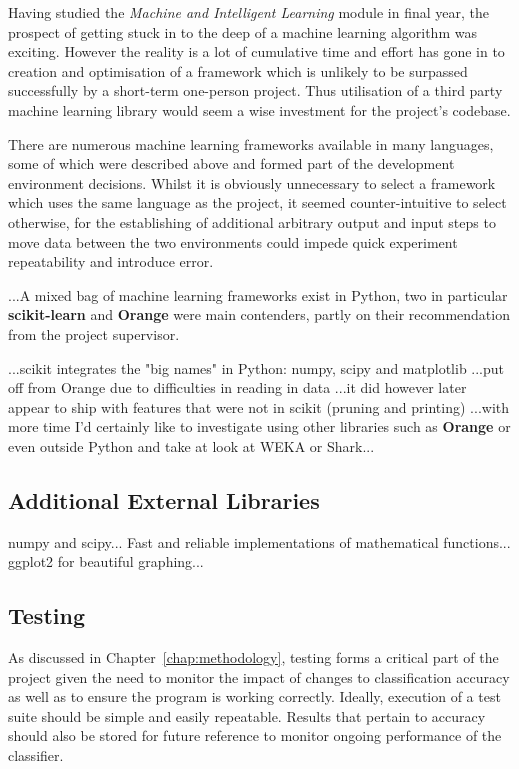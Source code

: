 Having studied the \textit{Machine and Intelligent Learning} module in final
year, the prospect of getting stuck in to the deep of a machine learning
algorithm was exciting. However the reality is a lot of cumulative time and
effort has gone in to creation and optimisation of a framework which is unlikely
to be surpassed successfully by a short-term one-person project. Thus
utilisation of a third party machine learning library would seem a wise
investment for the project's codebase.

There are numerous machine learning frameworks available in many languages, some
of which were described above and formed part of the development environment
decisions. Whilst it is obviously unnecessary to select a framework which uses
the same language as the project, it seemed counter-intuitive to select otherwise,
for the establishing of additional arbitrary output and input steps to move data
between the two environments could impede quick experiment repeatability and
introduce error.

...A mixed bag of machine learning frameworks exist in Python, two in particular
\textbf{scikit-learn}\citep{scikit-learn} and \textbf{Orange}\citep{orange}
were main contenders, partly on their recommendation from the project
supervisor.

...scikit integrates the "big names" in Python: numpy, scipy and matplotlib
...put off from Orange due to difficulties in reading in data ...it did however
later appear to ship with features that were not in scikit (pruning and
printing) ...with more time I'd certainly like to investigate using other
libraries such as \textbf{Orange} or even outside Python and take at look at WEKA
or Shark...

\subsection{Additional External Libraries}
numpy\citep{numpyscipy} and scipy\citep{scipy}... Fast and reliable implementations of
mathematical functions...  ggplot2\citep{ggplot2} for beautiful graphing...


\subsection{Testing}

As discussed in Chapter~\ref{chap:methodology}, testing forms a critical part of
the project given the need to monitor the impact of changes to classification
accuracy as well as to ensure the program is working correctly. Ideally,
execution of a test suite should be simple and easily repeatable. Results that
pertain to accuracy should also be stored for future reference to monitor
ongoing performance of the classifier.

